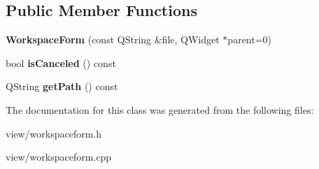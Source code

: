 \subsection*{Public Member Functions}
\begin{DoxyCompactItemize}
\item 
\hypertarget{class_workspace_form_a64422921f8f82151104cf75d8c373b9c}{{\bfseries Workspace\-Form} (const Q\-String \&file, Q\-Widget $\ast$parent=0)}\label{class_workspace_form_a64422921f8f82151104cf75d8c373b9c}

\item 
\hypertarget{class_workspace_form_a8c240f708f4bb93df0c643e8b06ddfb8}{bool {\bfseries is\-Canceled} () const }\label{class_workspace_form_a8c240f708f4bb93df0c643e8b06ddfb8}

\item 
\hypertarget{class_workspace_form_a584ed4f035c6cc31b470395a5669ff2a}{Q\-String {\bfseries get\-Path} () const }\label{class_workspace_form_a584ed4f035c6cc31b470395a5669ff2a}

\end{DoxyCompactItemize}


The documentation for this class was generated from the following files\-:\begin{DoxyCompactItemize}
\item 
view/workspaceform.\-h\item 
view/workspaceform.\-cpp\end{DoxyCompactItemize}
